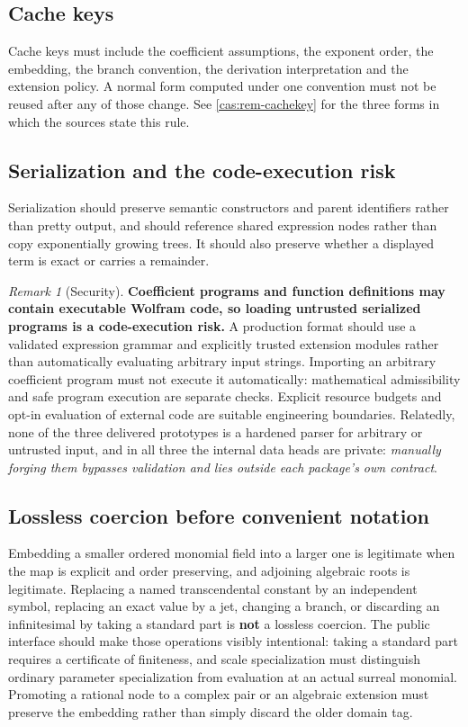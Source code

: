 \documentclass[11pt,letterpaper]{article}
\numberwithin{equation}{section}
\theoremstyle{definition}
\theoremstyle{remark}
\newtheorem{remark}[theorem]{Remark}
\begin{document}
\subsection{Cache keys}
\label{cas:sub-cachekeys}
Cache keys must include the coefficient assumptions, the exponent order, the
embedding, the branch convention, the derivation interpretation and the
extension policy. A normal form computed under one convention must not be reused
after any of those change. See \cref{cas:rem-cachekey} for the three forms in
which the sources state this rule.

\subsection{Serialization and the code-execution risk}
\label{cas:sub-serialization}
Serialization should preserve semantic constructors and parent identifiers
rather than pretty output, and should reference shared expression nodes rather
than copy exponentially growing trees. It should also preserve whether a
displayed term is exact or carries a remainder.

\begin{remark}[Security]\label{cas:rem-security}
\textbf{Coefficient programs and function definitions may contain executable
Wolfram code, so loading untrusted serialized programs is a code-execution
risk.} A production format should use a validated expression grammar and
explicitly trusted extension modules rather than automatically evaluating
arbitrary input strings. Importing an arbitrary coefficient program must not
execute it automatically: mathematical admissibility and safe program execution
are separate checks. Explicit resource budgets and opt-in evaluation of external
code are suitable engineering boundaries. Relatedly, none of the three delivered
prototypes is a hardened parser for arbitrary or untrusted input, and in all
three the internal data heads are private: \emph{manually forging them bypasses
validation and lies outside each package's own contract}.
\end{remark}

\subsection{Lossless coercion before convenient notation}
\label{cas:sub-coercion}
Embedding a smaller ordered monomial field into a larger one is legitimate when
the map is explicit and order preserving, and adjoining algebraic roots is
legitimate. Replacing a named transcendental constant by an independent symbol,
replacing an exact value by a jet, changing a branch, or discarding an
infinitesimal by taking a standard part is \textbf{not} a lossless coercion. The
public interface should make those operations visibly intentional: taking a
standard part requires a certificate of finiteness, and scale specialization
must distinguish ordinary parameter specialization from evaluation at an actual
surreal monomial. Promoting a rational node to a complex pair or an algebraic
extension must preserve the embedding rather than simply discard the older
domain tag.
\end{document}
